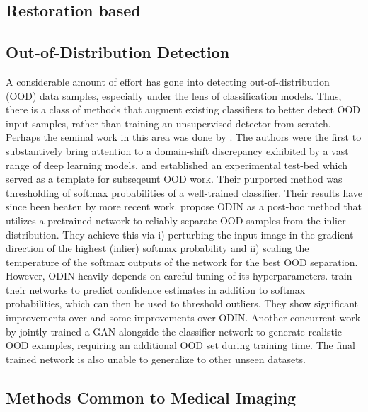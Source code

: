 \subsection{Restoration based}

\subsection{Out-of-Distribution Detection}
A considerable amount of effort has gone into detecting out-of-distribution (OOD) data samples, especially under the lens of classification models. Thus, there is a class of methods that augment existing classifiers to better detect OOD input samples, rather than training an unsupervised detector from scratch. Perhaps the seminal work in this area was done by \cite{Hendrycks2019}. The authors were the first to substantively bring attention to a domain-shift discrepancy exhibited by a vast range of deep learning models, and established an experimental test-bed which served as a template for subseqeunt OOD work. Their purported method was thresholding of softmax probabilities of a well-trained classifier. Their results have since been beaten by more recent work. \cite{Liang2017} propose ODIN as a post-hoc method that utilizes a pretrained network to reliably separate OOD samples from the inlier distribution. They achieve this via i) perturbing the input image in the gradient direction of the highest (inlier) softmax probability and ii) scaling the temperature of the softmax outputs of the network for the best OOD separation. However, ODIN heavily depends on careful tuning of its hyperparameters. \cite{devries2018learning} train their networks to predict confidence estimates in addition to softmax probabilities, which can then be used to threshold outliers. They show significant improvements over \cite{Hendrycks2019} and some improvements over ODIN. Another concurrent work by \cite{Lee2018} jointly trained a GAN alongside the classifier network to generate realistic OOD examples, requiring an additional OOD set during training time. The final trained network is also unable to generalize to other unseen datasets.


\subsection{Methods Common to Medical Imaging}
